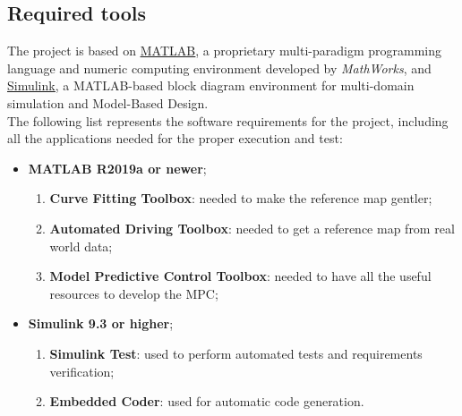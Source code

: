 \subsection{Required tools}
The project is based on \href{https://www.mathworks.com/help/matlab/index.html?s_tid=srchtitle}{\underline{MATLAB}}, a proprietary multi-paradigm programming language and numeric computing environment developed by \textit{MathWorks}, and \href{https://www.mathworks.com/help/simulink/index.html?s_tid=CRUX_lftnav}{\underline{Simulink}}, a MATLAB-based block diagram environment for multi-domain simulation and Model-Based Design.\\
The following list represents the software requirements for the project, including all the applications needed for the proper execution and test:
\begin{itemize}
    \item \textbf{MATLAB R2019a or newer};
    \begin{enumerate}
            \item \textbf{Curve Fitting Toolbox}: needed to make the reference map gentler;
            \item \textbf{Automated Driving Toolbox}: needed to get a reference map from real world data;
            \item \textbf{Model Predictive Control Toolbox}: needed to have all the useful resources to develop the MPC;
    \end{enumerate}
    \item \textbf{Simulink 9.3 or higher};
    \begin{enumerate}
            \item \textbf{Simulink Test}: used to perform automated tests and requirements verification;
            \item \textbf{Embedded Coder}: used for automatic code generation.
    \end{enumerate}
    
\end{itemize}




